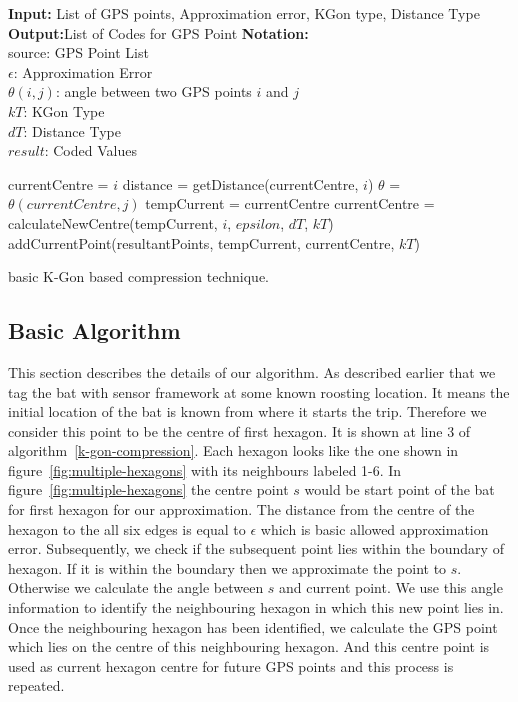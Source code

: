 \documentclass[conference]{IEEEtran}
\begin{document}
\begin{algorithm}[ht]
\textbf{Input:} List of GPS points, Approximation error, KGon type, Distance Type\\
\textbf{Output:}List of Codes for GPS Point
\textbf{Notation:}\\
source: GPS Point List\\
$\epsilon$: Approximation Error\\
$\theta(i,j)$: angle between two GPS points $i$ and $j$\\
$kT$: KGon Type\\
$dT$: Distance Type\\
$result$: Coded Values
\begin{algorithmic}[1]
   \State currentCentre = $i$
\Else
   \State distance = getDistance(currentCentre, $i$)
   \State $\theta$ = $\theta(currentCentre,j)$
        \State tempCurrent = currentCentre
        \State currentCentre = calculateNewCentre(tempCurrent, $i$, $epsilon$, $dT$, $kT$)
        \State addCurrentPoint(resultantPoints, tempCurrent, currentCentre, $kT$)
    \EndIf
\EndIf
\EndFor
\end{algorithmic}
\caption{basic K-Gon based compression technique.}
\label{k-gon-compression}
\end{algorithm}

\subsection{Basic Algorithm}
\label{subs:algorithm}

This section describes the details of our algorithm. As described earlier that we tag the bat with sensor framework at some known roosting location. It means the initial location of the bat is known from where it starts the trip. Therefore we consider this point to be the centre of first hexagon. It is shown at line 3 of algorithm~\ref{k-gon-compression}. Each hexagon looks like the one shown in figure~\ref{fig:multiple-hexagons} with its neighbours labeled 1-6. In figure~\ref{fig:multiple-hexagons} the centre point $s$ would be start point of the bat for first hexagon for our approximation. The distance from the centre of the hexagon to the all six edges is equal to $\epsilon$ which is basic allowed approximation error. Subsequently, we check if the subsequent point lies within the boundary of hexagon. If it is within the boundary then we approximate the point to $s$. Otherwise we calculate the angle between $s$ and current point. We use this angle information to identify the neighbouring hexagon in which this new point lies in. Once the neighbouring hexagon has been identified, we calculate the GPS point which lies on the centre of this neighbouring hexagon. And this centre point is used as current hexagon centre for future GPS points and this process is repeated.
\end{document}
